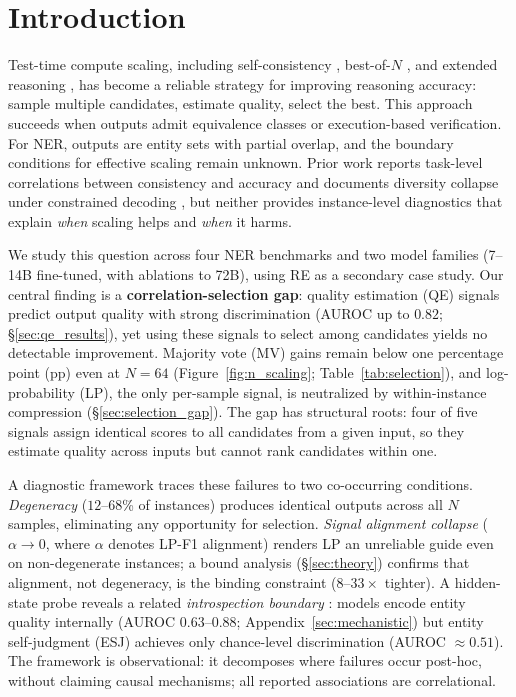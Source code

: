 \section{Introduction}\label{sec:introduction}

Test-time compute scaling, including self-consistency \cite{wang2023selfconsistency}, best-of-$N$ \cite{snell2025scaling, brown2024monkeys}, and extended reasoning \cite{muennighoff2025s1}, has become a reliable strategy for improving reasoning accuracy: sample multiple candidates, estimate quality, select the best.
This approach succeeds when outputs admit equivalence classes or execution-based verification.
For NER, outputs are entity sets with partial overlap, and the boundary conditions for effective scaling remain unknown.
Prior work reports task-level correlations between consistency and accuracy \cite{yao2026consistency} and documents diversity collapse under constrained decoding \cite{yun2025price}, but neither provides instance-level diagnostics that explain \textit{when} scaling helps and \textit{when} it harms.

We study this question across four NER benchmarks and two model families (7--14B fine-tuned, with ablations to 72B), using RE as a secondary case study.
Our central finding is a \textbf{correlation-selection gap}: quality estimation (QE) signals predict output quality with strong discrimination (AUROC up to $0.82$; \S\ref{sec:qe_results}), yet using these signals to select among candidates yields no detectable improvement.
Majority vote (MV) gains remain below one percentage point (pp) even at $N{=}64$ (Figure~\ref{fig:n_scaling}; Table~\ref{tab:selection}), and log-probability (LP), the only per-sample signal, is neutralized by within-instance compression (\S\ref{sec:selection_gap}).
The gap has structural roots: four of five signals assign identical scores to all candidates from a given input, so they estimate quality across inputs but cannot rank candidates within one.

A diagnostic framework traces these failures to two co-occurring conditions.
\textit{Degeneracy} ($12$--$68$\% of instances) produces identical outputs across all $N$ samples, eliminating any opportunity for selection.
\textit{Signal alignment collapse} ($\alpha{\to}0$, where $\alpha$ denotes LP-F1 alignment) renders LP an unreliable guide even on non-degenerate instances; a bound analysis (\S\ref{sec:theory}) confirms that alignment, not degeneracy, is the binding constraint ($8$--$33{\times}$ tighter).
A hidden-state probe reveals a related \textit{introspection boundary} \cite{huang2024large}: models encode entity quality internally (AUROC $0.63$--$0.88$; Appendix~\ref{sec:mechanistic}) but entity self-judgment (ESJ) achieves only chance-level discrimination (AUROC ${\approx}0.51$).
The framework is observational: it decomposes where failures occur post-hoc, without claiming causal mechanisms; all reported associations are correlational.

